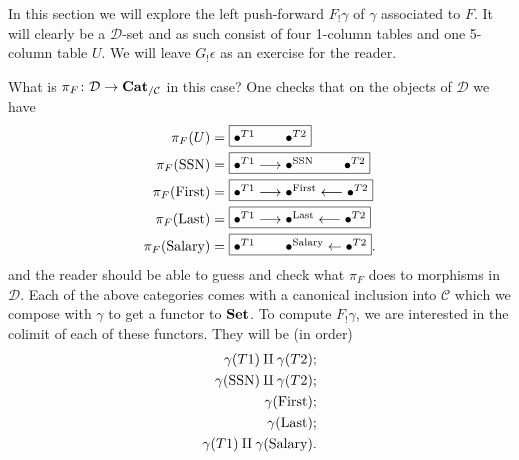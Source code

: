\documentclass{amsart}
\newcommand{\comment}[1]{}
\def\tn{\textnormal}
\def\mc{\mathcal}
\def\to{\rightarrow}
\def\from{\leftarrow}
\def\taking{\colon}
\def\too{\longrightarrow}
\def\fromm{\longleftarrow}
\def\Cat{{\bf Cat}}
\def\Set{{\bf Set}}
\def\mcC{\mc{C}}
\def\mcD{\mc{D}}
\theoremstyle{remark}
\theoremstyle{definition}
\begin{document}
In this section we will explore the left push-forward $F_!\gamma$ of $\gamma$ associated to $F$.  It will clearly be a $\mcD$-set and as such consist of four 1-column tables and one 5-column table $U$.  We will leave $G_!\epsilon$ as an exercise for the reader.

\comment{%

The basic idea for $F$ is the following (and for $G$ it is similar).  Every table (object) $c$ in $\mcC$ has a corresponding table $F(c)$ in $\mcD$.  Every row of $c$ must be inserted into $F(c)$.  Perhaps two tables in $\mcC$, say $c$ and $c'$, are both sent to the same table $d$ in $\mcD$; in this case we must simply insert a row in $d$ for each row in $c$ and each row of $c'$.  This leaves much to be dealt with.   For example, $F$ may introduce ``new columns" in some tables.

}%

What is $\pi_F\taking\mcD\to\Cat_{/\mcC}$ in this case?  One checks that on the objects of $\mcD$ we have \begin{align}\label{dia:ex pi}\pi_F(U)&=\fbox{$\bullet^{T1}\hspace{.3in}\bullet^{T2}$}\\\notag\pi_F(\tn{SSN})&=\fbox{$\bullet^{T1}\too\bullet^{\tn{SSN}}\hspace{.3in}\bullet^{T2}$}\\\notag\pi_F(\tn{First})&=\fbox{$\bullet^{T1}\too\bullet^{\tn{First}}\fromm \bullet^{T2}$}\\\notag\pi_F(\tn{Last})&=\fbox{$\bullet^{T1}\too\bullet^{\tn{Last}}\fromm\bullet^{T2}$}\\\notag\pi_F(\tn{Salary})&=\fbox{$\bullet^{T1}\hspace{.3in}\bullet^{\tn{Salary}}\from\bullet^{T2}$}.\end{align} and the reader should be able to guess and check what $\pi_F$ does to morphisms in $\mcD$.  Each of the above categories comes with a canonical inclusion into $\mcC$ which we compose with $\gamma$ to get a functor to $\Set$.  To compute $F_!\gamma$, we are interested in the colimit of each of these functors.  They will be (in order) \begin{align*}\gamma(T1)\amalg\gamma(T2);\\ \gamma(\tn{SSN})\amalg\gamma(T2);\\\gamma(\tn{First});\\\gamma(\tn{Last}); \\\gamma(T1)\amalg\gamma(\tn{Salary}).\end{align*}
\end{document}
